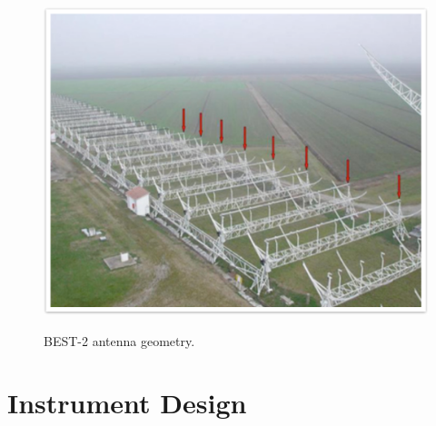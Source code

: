 \documentclass[useAMS,macros,usenatbib,onecolumn]{mn2e}
\begin{document}
\begin{figure}
{    \includegraphics[scale=0.4]{graphics/best2.pdf}
    \label{fig:best2}
    }
    \caption{BEST-2 antenna geometry.}
    \label{fig:array_layout}
\end{figure}

\section{Instrument Design}
\label{instrument design}

\end{document}
